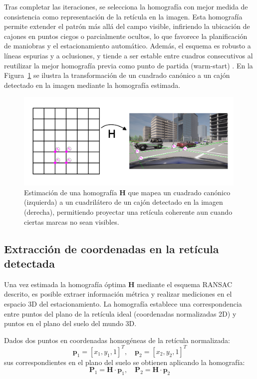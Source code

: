 Tras completar las iteraciones, se selecciona la homografía con mejor medida de consistencia 
como representación de la retícula en la imagen. 
Esta homografía permite extender el patrón más allá del campo visible, 
infiriendo la ubicación de cajones en puntos ciegos o parcialmente ocultos, 
lo que favorece la planificación de maniobras y el estacionamiento automático. 
Además, el esquema es robusto a líneas espurias y a oclusiones, 
y tiende a ser estable entre cuadros consecutivos al reutilizar la mejor homografía previa como
punto de partida (warm-start) . En la Figura~\ref{fig:ramsac-transform} se ilustra 
la transformación de un cuadrado canónico a un cajón detectado en la imagen mediante la homografía estimada.


\begin{figure}[!ht]
    \centering
    \includegraphics[width=0.99\textwidth]{img/3-metodo/transformacion.png}
    \caption{Estimación de una homografía \(\mathbf{H}\) que mapea un cuadrado canónico (izquierda) a un cuadrilátero de un cajón detectado en la imagen (derecha), permitiendo proyectar una retícula coherente aun cuando ciertas marcas no sean visibles.}
    \label{fig:ramsac-transform}
\end{figure}

\subsection{Extracción de coordenadas en la retícula detectada}

Una vez estimada la homografía óptima \(\mathbf{H}\) mediante el esquema RANSAC descrito, 
es posible extraer información métrica y realizar mediciones en el espacio 3D del estacionamiento. 
La homografía establece una correspondencia entre puntos del plano de la retícula ideal 
(coordenadas normalizadas 2D) y puntos en el plano del suelo del mundo 3D.

Dados dos puntos en coordenadas homogéneas de la retícula normalizada:
\begin{equation}
\mathbf{p}_1 = [x_1, y_1, 1]^T, \quad \mathbf{p}_2 = [x_2, y_2, 1]^T
\end{equation}
sus correspondientes en el plano del suelo se obtienen aplicando la homografía:
\begin{equation}
\mathbf{P}_1 = \mathbf{H} \cdot \mathbf{p}_1, \quad \mathbf{P}_2 = \mathbf{H} \cdot \mathbf{p}_2
\end{equation}

